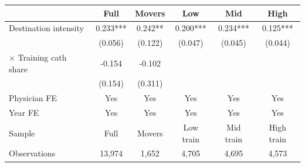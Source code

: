 
\begin{tabular}{lccccc}
\toprule
 & Full & Movers & Low & Mid & High\\
\midrule
Destination intensity & 0.233*** & 0.242** & 0.200*** & 0.234*** & 0.125***\\
 & (0.056) & (0.122) & (0.047) & (0.045) & (0.044)\\
$\times$ Training cath share & -0.154 & -0.102 &  &  & \\
 & (0.154) & (0.311) &  &  & \\
\midrule
Physician FE & Yes & Yes & Yes & Yes & Yes\\
Year FE & Yes & Yes & Yes & Yes & Yes\\
Sample & Full & Movers & Low train & Mid train & High train\\
Observations & 13,974 & 1,652 & 4,705 & 4,695 & 4,573\\
\bottomrule
\end{tabular}
